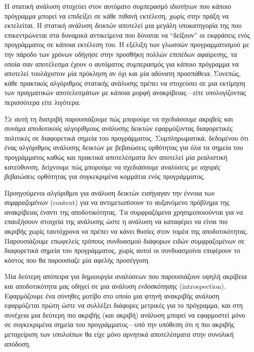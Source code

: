 Η στατική ανάλυση στοχεύει στον αυτόματο συμπερασμό ιδιοτήτων που κάποιο πρόγραμμα μπορεί να επιδείξει σε κάθε πιθανή εκτέλεση, χωρίς στην πράξη να εκτελείται. Η στατική ανάλυση \emph{δεικτών} αποτελεί μια μεγάλη υποκατηγορία της που επικεντρώνεται στα δυναμικά αντικείμενα που δύναται να ``δείξουν'' οι εκφράσεις ενός προγράμματος σε κάποια εκτέλεση του. Η εξέλιξη των γλωσσών προγραμματισμού με την πάροδο των χρόνων οδήγησε στην προσθήκη πολλών επιπέδων αφαίρεσης, τα οποία σαν αποτέλεσμα έχουν ο αυτόματος συμπερασμός για κάποιο πρόγραμμα να αποτελεί τουλάχιστον μία πρόκληση αν όχι και μία αδύνατη προσπάθεια. Συνεπώς, κάθε πρακτικός αλγόριθμος στατικής ανάλυσης πρέπει να στοχεύσει σε μια εκτίμηση των πραγματικών αποτελεσμάτων με κάποια μορφή ανακρίβειας---είτε υπολογίζοντας περισσότερα είτε λιγότερα.

Σε αυτή τη διατριβή παρουσιάζουμε πώς μπορούμε να σχεδιάσουμε \emph{ακριβείς} και συνάμα \emph{αποδοτικούς} αλγορίθμους ανάλυσης δεικτών εφαρμόζοντας διαφορετικές πολιτικές σε διαφορετικά σημεία του προγράμματος. Συμπληρωματικά, δεδομένου ότι ένας αλγόριθμος ανάλυσης δεικτών με βεβαιώσεις ορθότητας για όλα τα σημεία του προγράμματος καθώς και πρακτικά αποτελέσματα δεν αποτελεί μία ρεαλιστική κατεύθυνση, δείχνουμε πώς μπορούμε να σχεδιάσουμε αναλύσεις με \emph{ισχυρές βεβαιώσεις} ορθότητας για συγκεκριμένα κομμάτια ενός προγράμματος.

Προηγούμενοι αλγόριθμοι για ανάλυση δεικτών εισήγαγαν την έννοια των \emph{συμφραζομένων} ({\en context}) για να αντιμετωπίσουν το αυξανόμενο πρόβλημα της ανακρίβειας έναντι της αποδοτικότητας. Τα συμφραζόμενα χρησιμοποιούνται για να επαυξήσουν στοιχεία της ανάλυσης ώστε η ανάλυση να καταφέρει να είναι πιο ακριβής χωρίς ταυτόχρονα να πρέπει να κάνει θυσίες στον τομέα της αποδοτικότητας. Παρουσιάζουμε επωφελείς τρόπους συνδυασμού διάφορων ειδών συμφραζομένων σε διαφορετικά σημεία του προγράμματος, χωρίς αυτοί οι συνδυασμοίνα επιφέρουν το κόστος που θα παρουσίαζε μία αφελής προσέγγιση.

Μία δεύτερη απόπειρα για δημιουργία αναλύσεων που παρουσιάζουν υψηλή ακρίβεια και αποδοτικότητα μας οδηγεί σε μια ανάλυση \emph{ενδοσκόπησης} ({\en introspection}). Εφαρμόζουμε ένα σύνηθες μοτίβο στο οποίο μια φτηνή ανακριβής ανάλυση εφαρμόζεται πρώτη ώστε να συλλέξει διάφορες μετρικές για το πρόγραμμα, και στη συνέχεια μια δεύτερη πιο ακριβής (και ακριβή) ανάλυση μπορεί να εφαρμοστεί μόνο σε συγκεκριμένα σημεία του προγράμματος---υπό την υπόθεση ότι η πιο ακριβής μεταχείριση των υπολοίπων θα είχε μόνο αρνητικά αποτελέσματα στην συνολική απόδοση.

